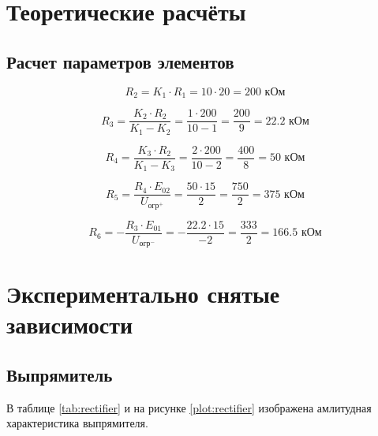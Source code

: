 \section{Теоретические расчёты}

\subsection{Расчет параметров элементов}

\begin{equation}
	\label{eq:4:1}
	R_2 = K_1 \cdot R_1 = 10 \cdot 20 = 200 \text{ кОм}
\end{equation}

\begin{equation}
	\label{eq:4:2}
	R_3 = \frac{K_2 \cdot R_2}{K_1 - K_2} = \frac{1 \cdot 200}{10 - 1} = \frac{200}{9} = 22.2 \text{ кОм}
\end{equation}

\begin{equation}
	\label{eq:4:3}
	R_4 = \frac{K_3 \cdot R_2}{K_1 - K_3} = \frac{2 \cdot 200}{10 - 2} = \frac{400}{8} = 50 \text{ кОм}
\end{equation}

\begin{equation}
	\label{eq:4:4}
	R_5 = \frac{R_4 \cdot E_{02}}{U_{\text{огр}^{+}}} = \frac{50 \cdot 15}{2} = \frac{750}{2} = 375 \text{ кОм}
\end{equation}


\begin{equation}
	\label{eq:4:5}
	R_6 = -\frac{R_3 \cdot E_{01}}{U_{\text{огр}^{-}}} = -\frac{22.2 \cdot 15}{-2} = \frac{333}{2} = 166.5 \text{ кОм}
\end{equation}

\section{Экспериментально снятые зависимости}

\subsection{Выпрямитель}

В таблице \ref{tab:rectifier} и на рисунке \ref{plot:rectifier} изображена амлитудная характеристика выпрямителя.

